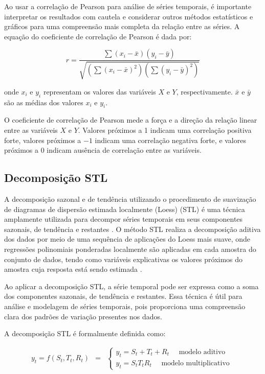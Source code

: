 Ao usar a correlação de Pearson para análise de séries temporais, é importante interpretar os resultados com cautela e considerar outros métodos estatísticos e gráficos para uma compreensão mais completa da relação entre as séries. A equação do coeficiente de correlação de Pearson é dada por:
 
 \begin{equation}
 	r=\frac{\sum\left(x_i-\bar{x}\right)\left(y_i-\bar{y}\right)}{\sqrt{\left(\sum\left(x_i-\bar{x}\right)^2\right)\left(\sum\left(y_i-\bar{y}\right)^2\right)}}
 \end{equation}
 
 \noindent onde $x_i$ e $y_i$ representam os valores das variáveis $X$ e $Y$, respectivamente. $\bar{x}$ e $\bar{y}$ são as médias dos valores $x_i$ e $y_i$. 
 
O coeficiente de correlação de Pearson mede a força e a direção da relação linear entre as variáveis $X$ e $Y$. Valores próximos a 1 indicam uma correlação positiva forte, valores próximos a $-1$ indicam uma correlação negativa forte, e valores próximos a $0$ indicam  ausência de correlação entre as variáveis.
 
\subsection{Decomposi\c c\~ao STL}
 
A decomposição sazonal e de tendência utilizando o procedimento de suavização de diagramas de dispersão estimada localmente (Loess) (STL) é uma técnica amplamente utilizada para decompor séries temporais em seus componentes sazonais, de tendência e restantes \cite{RIBEIRO2023112982}. O método STL realiza a decomposição aditiva dos dados por meio de uma sequência de aplicações do Loess mais suave, onde regressões polinomiais ponderadas localmente são aplicadas em cada amostra do conjunto de dados, tendo como variáveis explicativas os valores próximos do amostra cuja resposta está sendo estimada \cite{Theodosiou20111178}.
 
Ao aplicar a decomposição STL, a série temporal pode ser expressa como a soma dos componentes sazonais, de tendência e restantes. Essa técnica é útil para análise e modelagem de séries temporais, pois proporciona uma compreensão clara dos padrões de variação presentes nos dados.
 
A decomposição STL é formalmente definida como:
 
 \begin{eqnarray}
 	y_t=f\left(S_t, T_t, R_t\right)&=&\left\{\begin{array}{l}
 		y_t=S_t+T_t+R_t \quad \text { modelo aditivo } \\
 		y_t=S_t T_t R_t \quad \text { modelo multiplicativo }
 	\end{array}\right. \label{eq:stl}
 \end{eqnarray}

